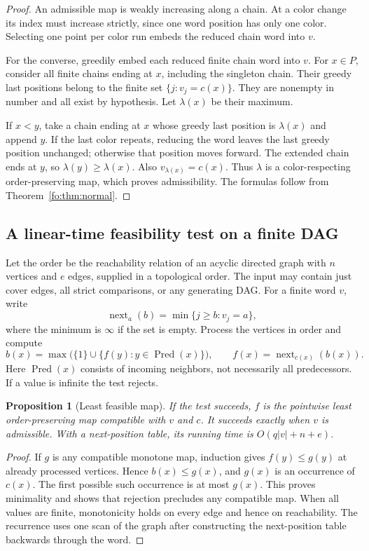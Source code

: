 \documentclass[11pt,letterpaper]{article}
\numberwithin{equation}{section}
\newtheorem{proposition}[proposition]{Proposition}
\theoremstyle{definition}
\theoremstyle{remark}
\theoremstyle{definition}
\newcommand{\len}[1]{\lvert #1\rvert}
\newcommand{\pred}{\operatorname{Pred}}
\begin{document}
\begin{proof}
An admissible map is weakly increasing along a chain. At a color change its
index must increase strictly, since one word position has only one color.
Selecting one point per color run embeds the reduced chain word into $v$.

For the converse, greedily embed each reduced finite chain word into $v$.
For $x\in P$, consider all finite chains ending at $x$, including the singleton
chain. Their greedy last positions belong to the finite set
$\{j:v_j=c(x)\}$. They are nonempty in number and all exist by hypothesis.
Let $\lambda(x)$ be their maximum.

If $x<y$, take a chain ending at $x$ whose greedy last position is
$\lambda(x)$ and append $y$. If the last color repeats, reducing the word leaves
the last greedy position unchanged; otherwise that position moves forward.
The extended chain ends at $y$, so $\lambda(y)\ge\lambda(x)$. Also
$v_{\lambda(x)}=c(x)$. Thus $\lambda$ is a color-respecting order-preserving map,
which proves admissibility. The formulas follow from Theorem~\ref{fo:thm:normal}.
\end{proof}

\subsection{A linear-time feasibility test on a finite DAG}

Let the order be the reachability relation of an acyclic directed graph with
$n$ vertices and $e$ edges, supplied in a topological order. The input may
contain just cover edges, all strict comparisons, or any generating DAG.
For a finite word $v$, write
\[
 \operatorname{next}_a(b)=\min\{j\ge b:v_j=a\},
\]
where the minimum is $\infty$ if the set is empty. Process the vertices in
order and compute
\begin{equation}\label{fo:eq:greedy}
 b(x)=\max\bigl(\{1\}\cup\{f(y):y\in\pred(x)\}\bigr),\qquad
 f(x)=\operatorname{next}_{c(x)}(b(x)).
\end{equation}
Here $\pred(x)$ consists of incoming neighbors, not necessarily all predecessors.
If a value is infinite the test rejects.

\begin{proposition}[Least feasible map]\label{fo:prop:greedy}
If the test succeeds, $f$ is the pointwise least order-preserving map compatible
with $v$ and $c$. It succeeds exactly when $v$ is admissible. With a next-position
table, its running time is $O(q\len{v}+n+e)$.
\end{proposition}
\begin{proof}
If $g$ is any compatible monotone map, induction gives $f(y)\le g(y)$ at
already processed vertices. Hence $b(x)\le g(x)$, and $g(x)$ is an occurrence
of $c(x)$. The first possible such occurrence is at most $g(x)$. This proves
minimality and shows that rejection precludes any compatible map. When all
values are finite, monotonicity holds on every edge and hence on reachability.
The recurrence uses one scan of the graph after constructing the next-position
table backwards through the word.
\end{proof}
\end{document}

